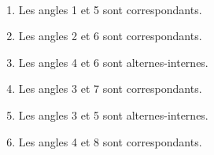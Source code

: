    \ \\ [-5mm]
   \begin{enumerate}
      \item Les angles 1 et 5 sont {\blue correspondants}.
      \item Les angles 2 et 6 sont {\blue correspondants}.
      \item Les angles 4 et 6 sont {\blue alternes-internes}.
      \item Les angles 3 et 7 sont {\blue correspondants}.
      \item Les angles 3 et 5 sont {\blue alternes-internes}.
      \item Les angles 4 et 8 sont {\blue correspondants}.
   \end{enumerate}
